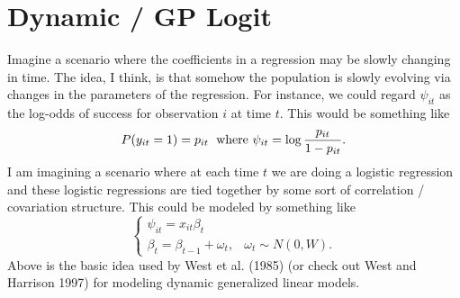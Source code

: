 \documentclass{article}
\begin{document}
\large %
\linespread{1.1} %

\setcounter{section}{0}

\section{Dynamic / GP Logit}

Imagine a scenario where the coefficients in a regression may be slowly changing
in time.  The idea, I think, is that somehow the population is slowly evolving
via changes in the parameters of the regression.  For instance, we could regard
$\psi_{it}$ as the log-odds of success for observation $i$ at time $t$.  This
would be something like
\[
P(y_{it}=1) = p_{it} \; \textmd{ where } \psi_{it} = \log \frac{p_{it}}{1-p_{it}}.
\]
I am imagining a scenario where at each time $t$ we are doing a logistic
regression and these logistic regressions are tied together by some sort of
correlation / covariation structure.  This could be modeled by something like
\[
\begin{cases}
\psi_{it} = x_{it} \beta_t \\
\beta_t = \beta_{t-1} + \omega_t, & \omega_t \sim N(0, W).
\end{cases}
\]
Above is the basic idea used by West et al. (1985) (or check out West and
Harrison 1997) for modeling dynamic generalized linear models.
\end{document}
